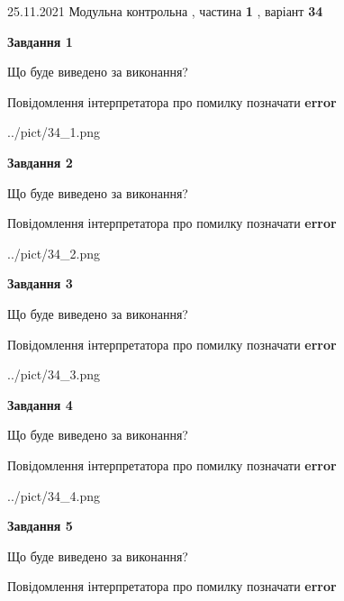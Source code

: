 \documentclass[10pt, ukrainian]{article}
\begin{document}
{25.11.2021 Модульна контрольна , частина \textbf { 1 }, варіант  \No \textbf { 34 }\par}
{
\begin {large}

{\begin {center}\textbf{Завдання 1}\end {center}}\par
Що буде виведено за виконання? \par
Повідомлення інтерпретатора про помилку позначати \textbf{error}

\begin{center}
	{../pict/34_1.png}
\end{center}
\newpage

{\begin {center}\textbf{Завдання 2}\end {center}}\par
Що буде виведено за виконання? \par
Повідомлення інтерпретатора про помилку позначати \textbf{error}

\begin{center}
	{../pict/34_2.png}
\end{center}
\newpage

{\begin {center}\textbf{Завдання 3}\end {center}}\par
Що буде виведено за виконання? \par
Повідомлення інтерпретатора про помилку позначати \textbf{error}

\begin{center}
	{../pict/34_3.png}
\end{center}
\newpage

{\begin {center}\textbf{Завдання 4}\end {center}}\par
Що буде виведено за виконання? \par
Повідомлення інтерпретатора про помилку позначати \textbf{error}

\begin{center}
	{../pict/34_4.png}
\end{center}
\newpage

{\begin {center}\textbf{Завдання 5}\end {center}}\par
Що буде виведено за виконання? \par
Повідомлення інтерпретатора про помилку позначати \textbf{error}


\end{large}}
\end{document}
